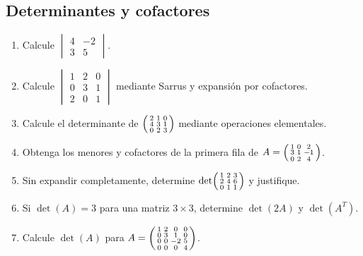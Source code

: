 \documentclass[12pt]{article}
\theoremstyle{remark}
\newcounter{contadorEjercicio}
\newenvironment{listaejercicios}{\begin{enumerate}[label=\textbf{E\arabic*.},leftmargin=2.4em,itemsep=0.52em]\setcounter{enumi}{\value{contadorEjercicio}}}{\setcounter{contadorEjercicio}{\value{enumi}}\end{enumerate}}
\begin{document}
\subsection{Determinantes y cofactores}
\begin{listaejercicios}
\item Calcule $\begin{vmatrix}4&-2\\3&5\end{vmatrix}$.
\item Calcule $\begin{vmatrix}1&2&0\\0&3&1\\2&0&1\end{vmatrix}$ mediante Sarrus y expansión por cofactores.
\item Calcule el determinante de $\begin{psmallmatrix}2&1&0\\4&3&1\\0&2&3\end{psmallmatrix}$ mediante operaciones elementales.
\item Obtenga los menores y cofactores de la primera fila de $A=\begin{psmallmatrix}1&0&2\\3&1&-1\\0&2&4\end{psmallmatrix}$.
\item Sin expandir completamente, determine $\det\begin{psmallmatrix}1&2&3\\2&4&6\\0&1&1\end{psmallmatrix}$ y justifique.
\item Si $\det(A)=3$ para una matriz $3\times3$, determine $\det(2A)$ y $\det(A^T)$.
\item Calcule $\det(A)$ para $A=\begin{psmallmatrix}1&2&0&0\\0&3&1&0\\0&0&-2&5\\0&0&0&4\end{psmallmatrix}$.
\end{listaejercicios}
\end{document}
